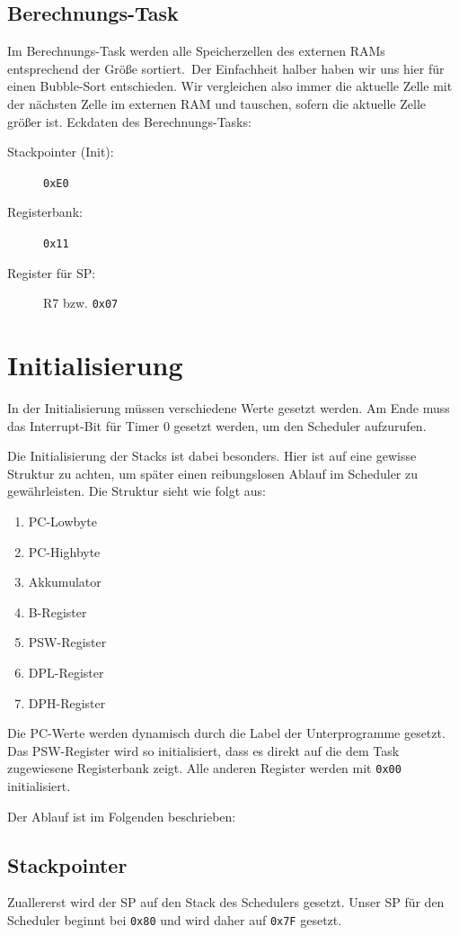 \subsection{Berechnungs-Task}
Im Berechnungs-Task \glqq werden alle Speicherzellen des externen RAMs entsprechend der Größe sortiert.\grqq\ 
Der Einfachheit halber haben wir uns hier für einen Bubble-Sort entschieden.
Wir vergleichen also immer die aktuelle Zelle mit der nächsten Zelle im externen RAM und tauschen, sofern die aktuelle Zelle größer ist.
Eckdaten des Berechnungs-Tasks:
\begin{description}
    \item[Stackpointer (Init):] \verb|0xE0|
    \item[Registerbank:] \verb|0x11| 
    \item[Register für SP:] R7 bzw. \verb|0x07| 
\end{description}

\section{Initialisierung}
In der Initialisierung müssen verschiedene Werte gesetzt werden.
Am Ende muss das Interrupt-Bit für Timer 0 gesetzt werden, um den Scheduler aufzurufen.

Die Initialisierung der Stacks ist dabei besonders.
Hier ist auf eine gewisse Struktur zu achten, um später einen reibungslosen Ablauf im Scheduler zu gewährleisten.
Die Struktur sieht wie folgt aus:
\begin{enumerate}
    \item PC-Lowbyte
    \item PC-Highbyte
    \item Akkumulator
    \item B-Register
    \item PSW-Register
    \item DPL-Register
    \item DPH-Register
\end{enumerate}
Die PC-Werte werden dynamisch durch die Label der Unterprogramme gesetzt.
Das PSW-Register wird so initialisiert, dass es direkt auf die dem Task zugewiesene Registerbank zeigt.
Alle anderen Register werden mit \verb|0x00| initialisiert.

Der Ablauf ist im Folgenden beschrieben:
\subsection{Stackpointer}
Zuallererst wird der SP auf den Stack des Schedulers gesetzt.
Unser SP für den Scheduler beginnt bei \verb|0x80| und wird daher auf \verb|0x7F| gesetzt.

